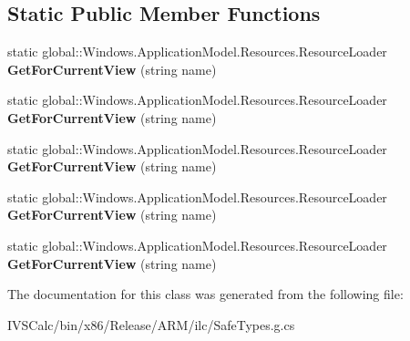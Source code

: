 \subsection*{Static Public Member Functions}
\begin{DoxyCompactItemize}
\item 
\mbox{\label{class_windows_1_1_application_model_1_1_resources_1_1_resource_loader_aafd8b572d234c736761ad48a889974df}} 
static global\+::\+Windows.\+Application\+Model.\+Resources.\+Resource\+Loader {\bfseries Get\+For\+Current\+View} (string name)
\item 
\mbox{\label{class_windows_1_1_application_model_1_1_resources_1_1_resource_loader_aafd8b572d234c736761ad48a889974df}} 
static global\+::\+Windows.\+Application\+Model.\+Resources.\+Resource\+Loader {\bfseries Get\+For\+Current\+View} (string name)
\item 
\mbox{\label{class_windows_1_1_application_model_1_1_resources_1_1_resource_loader_aafd8b572d234c736761ad48a889974df}} 
static global\+::\+Windows.\+Application\+Model.\+Resources.\+Resource\+Loader {\bfseries Get\+For\+Current\+View} (string name)
\item 
\mbox{\label{class_windows_1_1_application_model_1_1_resources_1_1_resource_loader_aafd8b572d234c736761ad48a889974df}} 
static global\+::\+Windows.\+Application\+Model.\+Resources.\+Resource\+Loader {\bfseries Get\+For\+Current\+View} (string name)
\item 
\mbox{\label{class_windows_1_1_application_model_1_1_resources_1_1_resource_loader_aafd8b572d234c736761ad48a889974df}} 
static global\+::\+Windows.\+Application\+Model.\+Resources.\+Resource\+Loader {\bfseries Get\+For\+Current\+View} (string name)
\end{DoxyCompactItemize}


The documentation for this class was generated from the following file\+:\begin{DoxyCompactItemize}
\item 
I\+V\+S\+Calc/bin/x86/\+Release/\+A\+R\+M/ilc/Safe\+Types.\+g.\+cs\end{DoxyCompactItemize}
